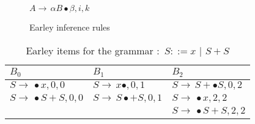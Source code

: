 \begin{isabellebody}
\begin{isamarkuptext}
\begin{figure}[htpb]
\begin{mathpar}
      {$A \rightarrow \, \alpha B \bullet \beta, i, k$}
    \end{mathpar}
    \caption[Earley inference rules]{Earley inference rules}\label{fig:earley-inference-rules}
    \label{fig:inference_rules}
  \end{figure}%
\end{isamarkuptext}\isamarkuptrue%
%
\begin{isamarkuptext}%
\begin{table}[htpb] 
    \caption[Earley items running example]{Earley items for the grammar \isa{{\isasymG}}: $\, S ::= x \,\, \vert \,\, S + S$}\label{tab:earley-items}
    \centering
    \begin{tabular}{| l | l | l |}
        $B_0$                                   & $B_1$                                    & $B_2$                                \\
      \midrule
        $S \rightarrow \, \bullet x, 0, 0$      & $S \rightarrow \, x \bullet, 0, 1$     & $S \rightarrow \, S + \bullet S, 0, 2$ \\
        $S \rightarrow \, \bullet S + S, 0 , 0$ & $S \rightarrow \, S \bullet + S, 0, 1$ & $S \rightarrow \, \bullet x, 2, 2$     \\
                                                &                                        & $S \rightarrow \, \bullet S + S, 2, 2$ \\

      \midrule


\end{tabular}
\end{table}
\end{isamarkuptext}
\end{isabellebody}
